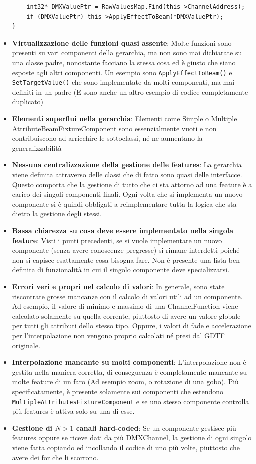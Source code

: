 \documentclass[main.tex]{subfiles}
\begin{document}
\begin{itemize}
\begin{lstlisting}
	int32* DMXValuePtr = RawValuesMap.Find(this->ChannelAddress);
	if (DMXValuePtr) this->ApplyEffectToBeam(*DMXValuePtr);
}
\end{lstlisting}
    \item \textbf{Virtualizzazione delle funzioni quasi assente}: Molte funzioni sono presenti su vari componenti della gerarchia, ma non sono mai dichiarate su una classe padre, nonostante facciano la stessa cosa ed è giusto che siano esposte agli altri componenti. Un esempio sono \lstinline{ApplyEffectToBeam()} e \lstinline{SetTargetValue()} che sono implementate da molti componenti, ma mai definiti in un padre (E sono anche un altro esempio di codice completamente duplicato) 
    \item \textbf{Elementi superflui nella gerarchia}: Elementi come Simple o Multiple AttributeBeamFixtureComponent sono essenzialmente vuoti e non contribuiscono ad arricchire le sottoclassi, né ne aumentano la generalizzabilità
    \item \textbf{Nessuna centralizzazione della gestione delle features}: La gerarchia viene definita attraverso delle classi che di fatto sono quasi delle interfacce. Questo comporta che la gestione di tutto che ci sta attorno ad una feature è a carico dei singoli componenti finali. Ogni volta che si implementa un nuovo componente si è quindi obbligati a reimplementare tutta la logica che sta dietro la gestione degli stessi.
    \item \textbf{Bassa chiarezza su cosa deve essere implementato nella singola feature}: Visti i punti precedenti, se si vuole implementare un nuovo componente (senza avere conoscenze pregresse) si rimane interdetti poiché non si capisce esattamente cosa bisogna fare. Non è presente una lista ben definita di funzionalità in cui il singolo componente deve specializzarsi.
    \item \textbf{Errori veri e propri nel calcolo di valori}: In generale, sono state riscontrate grosse mancanze con il calcolo di valori utili ad un componente. Ad esempio, il valore di minimo e massimo di una ChannelFunction viene calcolato solamente su quella corrente, piuttosto di avere un valore globale per tutti gli attributi dello stesso tipo. Oppure, i valori di fade e accelerazione per l'interpolazione non vengono proprio calcolati né presi dal GDTF originale.
    \item \textbf{Interpolazione mancante su molti componenti}: L'interpolazione non è gestita nella maniera corretta, di conseguenza è completamente mancante su molte feature di un faro (Ad esempio zoom, o rotazione di una gobo). Più specificatamente, è presente solamente sui componenti che estendono \lstinline{MultipleAttributesFixtureComponent} e se uno stesso componente controlla più features è attiva solo su una di esse.
    \item \textbf{Gestione di $N > 1$ canali hard-coded}: Se un componente gestisce più features oppure se riceve dati da più DMXChannel, la gestione di ogni singolo viene fatta copiando ed incollando il codice di uno più volte, piuttosto che avere dei for che li scorrono.
\end{itemize}
\end{document}
